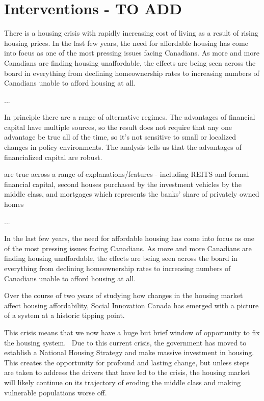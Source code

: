 \chapter{Interventions - TO ADD}

There is a housing crisis with rapidly increasing cost of living as a result of rising housing prices. 
In the last few years, the need for affordable housing has come into focus as one of the most pressing issues facing Canadians. As more and more Canadians are finding housing unaffordable, the effects are being seen across the board in everything from declining homeownership rates to increasing numbers of Canadians unable to afford housing at all.

...

In principle there are a range of alternative regimes.
The advantages of financial capital have multiple sources, so the result does not require that any one advantage be true all of the time, so it's not sensitive to small or localized changes in policy environments. The analysis tells us that the advantages of financialized capital are robust.

are true across a range of explanations/features - including REITS and formal financial capital, second houses purchased by the investment vehicles by the middle class, and mortgages which represents the banks' share of privately owned homes


...


In the last few years, the need for affordable housing has come into focus as one of the most pressing issues facing Canadians. As more and more Canadians are finding housing unaffordable, the effects are being seen across the board in everything from declining homeownership rates to increasing numbers of Canadians unable to afford housing at all.

Over the course of two years of studying how changes in the housing market affect housing affordability, Social Innovation Canada has emerged with a picture of a system at a historic tipping point. 

This crisis means that we now have a huge but brief window of opportunity to fix the housing system.  Due to this current crisis, the government has moved to establish a National Housing Strategy and make massive investment in housing. This creates the opportunity for profound and lasting change, but unless steps are taken to address the drivers that have led to the crisis, the housing market will likely continue on its trajectory of eroding the middle class and making vulnerable populations worse off.   

